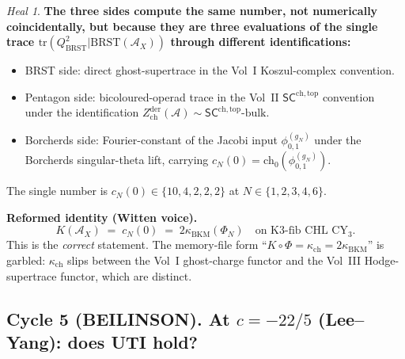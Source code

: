 \documentclass[11pt]{amsart}
\theoremstyle{definition}
\theoremstyle{remark}
\newtheorem{heal}[theorem]{Heal}
\newcommand{\CY}{\mathrm{CY}}
\newcommand{\kch}{\kappa_{\mathrm{ch}}}
\newcommand{\kBKM}{\kappa_{\mathrm{BKM}}}
\newcommand{\BRST}{\mathrm{BRST}}
\begin{document}
\begin{heal}
\textbf{The three sides compute the same number, not numerically coincidentally, but because
they are three evaluations of the single trace $\mathrm{tr}(Q_{\BRST}^2 | \BRST(\mathcal{A}_X))$
through different identifications:}
\begin{itemize}
\item BRST side: direct ghost-supertrace in the Vol~I Koszul-complex convention.
\item Pentagon side: bicoloured-operad trace in the Vol~II $\mathsf{SC}^{\mathrm{ch,top}}$ convention
under the identification $Z^{\mathrm{der}}_{\mathrm{ch}}(\mathcal{A}) \sim \mathsf{SC}^{\mathrm{ch,top}}\text{-bulk}$.
\item Borcherds side: Fourier-constant of the Jacobi input $\phi_{0,1}^{(g_N)}$ under the
Borcherds singular-theta lift, carrying $c_N(0) = \mathrm{ch}_0(\phi_{0,1}^{(g_N)})$.
\end{itemize}
The single number is $c_N(0) \in \{10, 4, 2, 2, 2\}$ at $N \in \{1,2,3,4,6\}$.

\textbf{Reformed identity (Witten voice).}
\[
\boxed{K(\mathcal{A}_X) \;=\; c_N(0) \;=\; 2 \kBKM(\Phi_N)} \quad \text{on K3-fib CHL } \CY_3.
\]
This is the \emph{correct} statement. The memory-file form ``$K \circ \Phi = \kch = 2\kBKM$''
is garbled: $\kch$ slips between the Vol~I ghost-charge functor and the Vol~III Hodge-supertrace
functor, which are distinct.
\end{heal}

\subsection{Cycle 5 (BEILINSON). At $c = -22/5$ (Lee--Yang): does UTI hold?}
\end{document}
